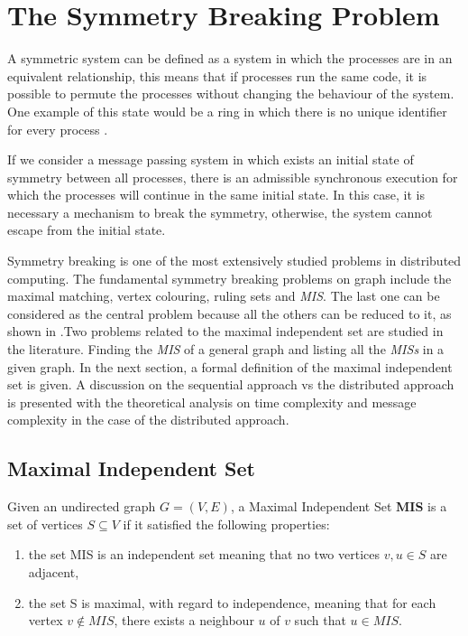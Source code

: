 \section{The Symmetry Breaking Problem}
\label{cap:2}

A symmetric system can be defined as a system in which the processes are in an equivalent relationship, this means that if processes run the same code, it is possible to permute the processes without changing the behaviour of the system. One example of this state would be a ring in which there is no unique identifier for every process \cite{boldi1996symmetry}.

If we consider a message passing system in which exists an initial state of symmetry between all processes, there is an admissible synchronous execution for which the processes will continue in the same initial state. In this case, it is necessary a mechanism to break the symmetry, otherwise, the system cannot escape from the initial state.

Symmetry breaking is one of the most extensively studied problems in distributed computing. The fundamental symmetry breaking problems on graph include the maximal matching, vertex colouring, ruling sets and \textit{MIS}. The last one can be considered as the central problem because all the others can be reduced to it, as shown in  \cite{linial1992locality}.Two problems related to the maximal independent set are studied in the literature. Finding the \textit{MIS} of a general graph and listing all the \textit{MISs} in a given graph. In the next section, a formal definition of the maximal independent set is given. A  discussion on the sequential approach vs the distributed approach is presented with the theoretical analysis on time complexity and message complexity in the case of the distributed approach.     

\subsection{Maximal Independent Set}

\theoremstyle{definition}
\begin{definition}

Given an undirected graph $G = (V,E)$, a Maximal Independent Set \textbf{MIS} is a set of vertices $S \subseteq V$ if it satisfied the following properties:   

\begin{enumerate}
  \item the set MIS is an independent set meaning that no two vertices $v,u \in S$ are adjacent,
  \item the set S is maximal, with regard to independence, meaning that for each vertex $v \notin MIS$, there exists a neighbour $u$ of $v$ such that $u \in MIS$.
\end{enumerate}

\end{definition}

